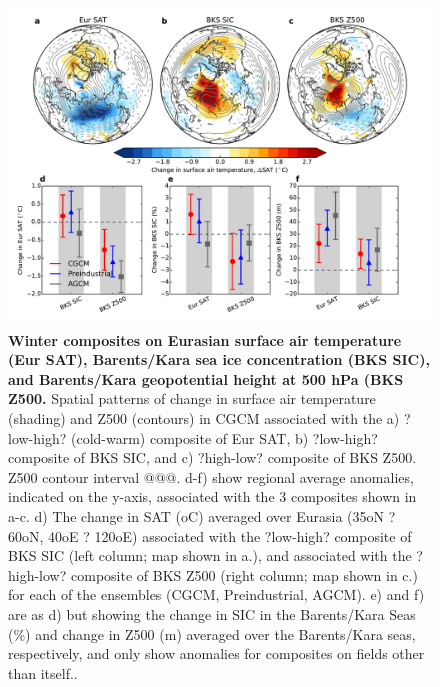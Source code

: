 \documentclass{nature}
\begin{document}
\begin{figure}%
\centering
\noindent\includegraphics[width=39pc]{Word/Figure_4.pdf}
\caption{\textbf{Winter composites on Eurasian surface air temperature (Eur SAT), Barents/Kara sea ice concentration (BKS SIC), and Barents/Kara geopotential height at 500 hPa (BKS Z500.} Spatial patterns of change in surface air temperature (shading) and Z500 (contours) in CGCM associated with the a) ?low-high? (cold-warm) composite of Eur SAT, b) ?low-high? composite of BKS SIC, and c) ?high-low? composite of BKS Z500. Z500 contour interval @@@. d-f) show regional average anomalies, indicated on the y-axis, associated with the 3 composites shown in a-c. d) The change in SAT (oC) averaged over Eurasia (35oN ? 60oN, 40oE ? 120oE) associated with the ?low-high? composite of BKS SIC (left column; map shown in a.), and associated with the ?high-low? composite of BKS Z500 (right column; map shown in c.) for each of the ensembles (CGCM, Preindustrial, AGCM). e) and f) are as d) but showing the change in SIC in the Barents/Kara Seas (\%) and change in Z500 (m) averaged over the Barents/Kara seas, respectively, and only show anomalies for composites on fields other than itself..
}
\label{fig:fig4} 
\end{figure}
\end{document}

